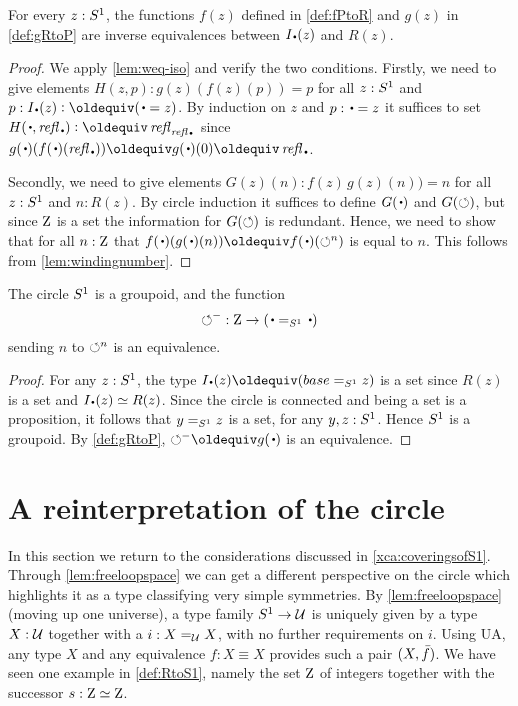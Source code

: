 \begin{lemma}
  \label{lem:univisexp}
For every $z:{S^1}$, the functions $f(z)$ defined in \cref{def:fPtoR} 
and $g(z)$ in \cref{def:gRtoP} are inverse equivalences between
$\uc{\base}(z)$ and $R(z)$.
\end{lemma}
\begin{proof}
We apply \cref{lem:weq-iso} and verify the two conditions.
  Firstly, we need to give elements $H(z,p):g(z)(f(z)(p))=p$
for all $z:{S^1}$ and $p:\uc{\base}(z)\defeq(\base=z)$. 
By induction on $z$ and $p:\base=z$ it suffices to set 
$H(\base,\refl\base)\defeq\refl{\refl{\base}}$ since
$g(\base)(f(\base)(\refl{\base}))\jdeq g(\base)(0)\jdeq\refl{\base}$.

Secondly, we need to give elements $G(z)(n):f(z)\,g(z)(n))=n$
for all $z:{S^1}$ and $n: R(z)$.
By circle induction it suffices to define $G(\base)$ and $G(\circlearrowleft)$,
but since $\mathrm{Z}$ is a set the information for $G(\circlearrowleft)$ is redundant.
Hence, we need to show that for all $n:\mathrm{Z}$ that 
$f(\base)(g(\base)(n))\jdeq  f(\base)(\Sloop^n)$ is equal to $n$.  
This follows from \cref{lem:windingnumber}. 
\end{proof}


\begin{corollary}\label{cor:S1groupoid}
The circle ${S^1}$ is a groupoid, and the function
\[
{\Sloop}^{-} : \zet\to(\base=_{\Sc}\base) %
\]
sending $n$ to $\circlearrowleft^n$ is an equivalence.
\end{corollary}
\begin{proof}
For any $z:{S^1}$, the type $\uc{\base}(z)\jdeq (base=_{\Sc}z)$ is a set 
since $R(z)$ is a set and $\uc{\base}(z) \equiv R(z)$.
Since the circle is connected and being a set is a proposition, it follows
that $y=_{{S^1}}z$ is a set, for any $y,z:{S^1}$. Hence ${S^1}$ is a groupoid.
By \cref{def:gRtoP}, ${\Sloop}^{-}\jdeq g(\base)$ is an equivalence.
\end{proof}


\section{A reinterpretation of the circle}
\label{sec:S1isC}
In this section we return to the considerations discussed in \cref{xca:coveringsofS1}.
Through \cref{lem:freeloopspace} we can get a different perspective on the circle which highlights it as a type classifying very simple symmetries.
By \cref{lem:freeloopspace} (moving up one universe), a type family ${S^1}\to\mathcal{U}$ is uniquely given by a type $X:\mathcal{U}$ together with a $i:X=_{\mathcal{U}} X$, with no further requirements on $i$.
Using UA, any type $X$ and any equivalence $f: X\equiv X$ provides such a pair
$(X,\bar {f})$. We have seen one example in \cref{def:RtoS1}, 
namely the set $\mathrm{Z}$ of integers together with the successor $s: \mathrm{Z}\simeq\mathrm{Z}$.

